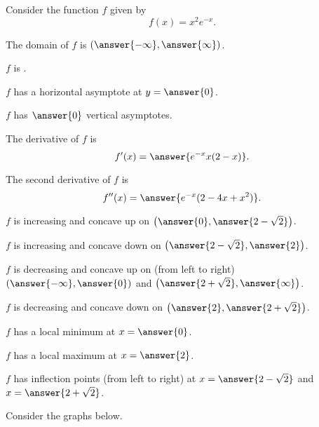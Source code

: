 \documentclass{ximera}
\author{Nela Lakos \and Kyle Parsons}
\begin{document}
\begin{exercise}

Consider the function $f$ given by 
\[
f(x) = x^2e^{-x}.
\]

The domain of $f$ is $\left(\answer{-\infty},\answer{\infty}\right)$.

$f$ is .

$f$ has a horizontal asymptote at $y=\answer{0}$.

$f$ has $\answer{0}$ vertical asymptotes.

The derivative of $f$ is
\[
f'(x) = \answer{e^{-x}x(2-x)}.
\]

The second derivative of $f$ is
\[
f''(x) = \answer{e^{-x}(2-4x+x^2)}.
\]

$f$ is increasing and concave up on $\left(\answer{0},\answer{2-\sqrt{2}}\right)$.

$f$ is increasing and concave down on $\left(\answer{2-\sqrt{2}},\answer{2}\right)$.

$f$ is decreasing and concave up on (from left to right) $\left(\answer{-\infty},\answer{0}\right)$ and $\left(\answer{2+\sqrt{2}},\answer{\infty}\right)$.

$f$ is decreasing and concave down on $\left(\answer{2},\answer{2+\sqrt{2}}\right)$.

$f$ has a local minimum at $x=\answer{0}$.

$f$ has a local maximum at $x=\answer{2}$.

$f$ has inflection points (from left to right) at $x=\answer{2-\sqrt{2}}$ and $x=\answer{2+\sqrt{2}}$.

Consider the graphs below.

\end{exercise}
\end{document}
